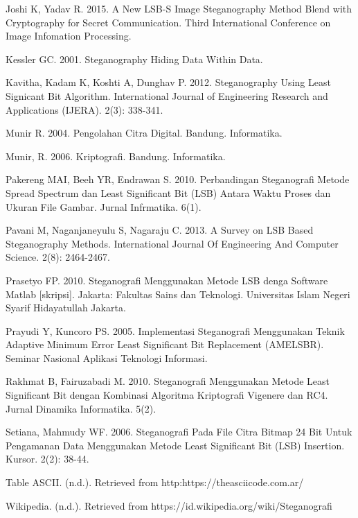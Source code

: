 \documentclass{jtetiskripsi}
\begin{document}
\begin{thebibliography}{99}
	 Joshi K, Yadav R. 2015. A New LSB-S Image Steganography Method Blend with Cryptography for Secret Communication. Third International Conference on Image Infomation Processing.
	
	 Kessler GC. 2001. Steganography Hiding Data Within Data.
	
	 Kavitha, Kadam K, Koshti A, Dunghav P. 2012. Steganography Using Least Signicant Bit Algorithm. International Journal of Engineering Research and Applications (IJERA). 2(3): 338-341.
	
	 Munir R. 2004. Pengolahan Citra Digital. Bandung. Informatika.
	
	 Munir, R. 2006. Kriptografi. Bandung. Informatika.
	
	 Pakereng MAI, Beeh YR, Endrawan S. 2010. Perbandingan Steganografi Metode Spread Spectrum dan Least Significant Bit (LSB) Antara Waktu Proses dan Ukuran File Gambar. Jurnal Infrmatika. 6(1).
	
	 Pavani M, Naganjaneyulu S, Nagaraju C. 2013. A Survey on LSB Based Steganography Methods. International Journal Of Engineering And Computer Science. 2(8): 2464-2467.
	
	 Prasetyo FP. 2010. Steganografi Menggunakan Metode LSB denga Software Matlab [skripsi]. Jakarta: Fakultas Sains dan Teknologi. Universitas Islam Negeri Syarif Hidayatullah Jakarta.
	
	 Prayudi Y, Kuncoro PS. 2005. Implementasi Steganografi Menggunakan Teknik Adaptive Minimum Error Least Significant Bit Replacement (AMELSBR). Seminar Nasional Aplikasi Teknologi Informasi.
	
	 Rakhmat B, Fairuzabadi M. 2010. Steganografi Menggunakan Metode Least Significant Bit dengan Kombinasi Algoritma Kriptografi Vigenere dan RC4. Jurnal Dinamika Informatika. 5(2).
	
	 Setiana, Mahmudy WF. 2006. Steganografi Pada File Citra Bitmap 24 Bit Untuk Pengamanan Data Menggunakan Metode Least Significant Bit (LSB) Insertion. Kursor. 2(2): 38-44.
	
	 Table ASCII. (n.d.). Retrieved from http:https://theasciicode.com.ar/
	
	 Wikipedia. (n.d.). Retrieved from https://id.wikipedia.org/wiki/Steganografi
		
		
	
\end{thebibliography}



%
\end{document}
